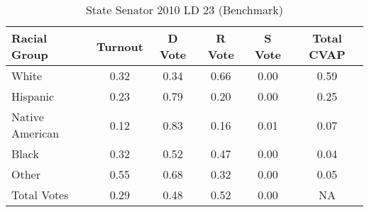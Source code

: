 \begin{table}[htb]
\begin{center}
\caption{State Senator 2010 LD 23 (Benchmark)}
\label{stsen10_cvap_ld_23_benchmark}
\begin{tabular}{lccccc}
  \hline
Racial Group & Turnout & D Vote & R Vote & S Vote & Total CVAP \\ 
  \hline
    White & 0.32  & 0.34  & 0.66  & 0.00  & 0.59 \\
    Hispanic & 0.23  & 0.79  & 0.20  & 0.00  & 0.25 \\
    Native American & 0.12  & 0.83  & 0.16  & 0.01  & 0.07 \\
    Black & 0.32  & 0.52  & 0.47  & 0.00  & 0.04 \\
    Other & 0.55  & 0.68  & 0.32  & 0.00  & 0.05 \\
    Total Votes & 0.29  & 0.48  & 0.52  & 0.00  &  NA \\
   \hline
\end{tabular}
\end{center}
\end{table}